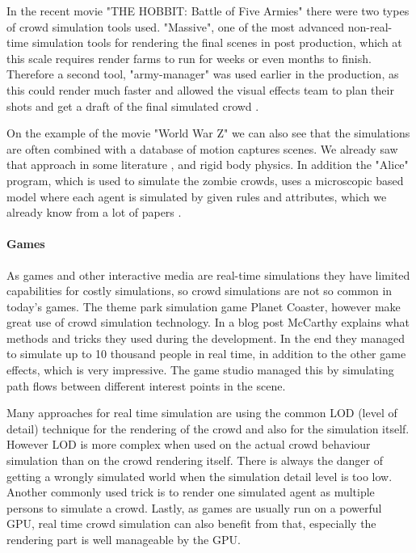 \documentclass{acmsiggraph}               %
\begin{document}
In the recent movie "THE HOBBIT: Battle of Five Armies" there were  two types of crowd simulation tools used. "Massive", one of the most advanced non-real-time simulation tools \cite{massive_website} for rendering the final scenes in post production, which at this scale requires render farms to run for weeks or even months to finish. Therefore a second tool, "army-manager" was used earlier in the production, as this could render much faster and allowed the visual effects team to plan their shots and get a draft of the final simulated crowd \cite{wired_hobbit_doku}.

On the example of the movie "World War Z" we can also see that the simulations are often combined with a database of motion captures scenes. We already saw that approach in some literature \cite{thalmann_crowd_2013}, and rigid body physics. In addition the "Alice" program, which is used to simulate the zombie crowds, uses a microscopic based model where each agent is simulated by given rules and attributes, which we already know from a lot of papers \cite{wired_worldwarz_doku}. 


\paragraph{Games}

As games and other interactive media are real-time simulations they have limited capabilities for costly simulations, so crowd simulations are not so common in today's games. The theme park simulation game Planet Coaster, however make great use of crowd simulation technology. In a blog post McCarthy  explains what methods and tricks they used during the development. In the end they managed to simulate up to 10 thousand people in real time, in addition to the other game effects, which is very impressive. The game studio managed this by simulating path flows between different interest points in the scene. 

Many approaches for real time simulation are using the common LOD (level of detail) technique for the rendering of the crowd and also for the simulation itself. However LOD is more complex when used on the actual crowd behaviour simulation than on the crowd rendering itself. There is always the danger of getting a wrongly simulated world when the simulation detail level is too low. Another commonly used trick is to render one simulated agent as multiple persons to simulate a crowd. Lastly, as games are usually run on a powerful GPU, real time crowd simulation can also benefit from that, especially the rendering part is well manageable by the GPU.
\end{document}
